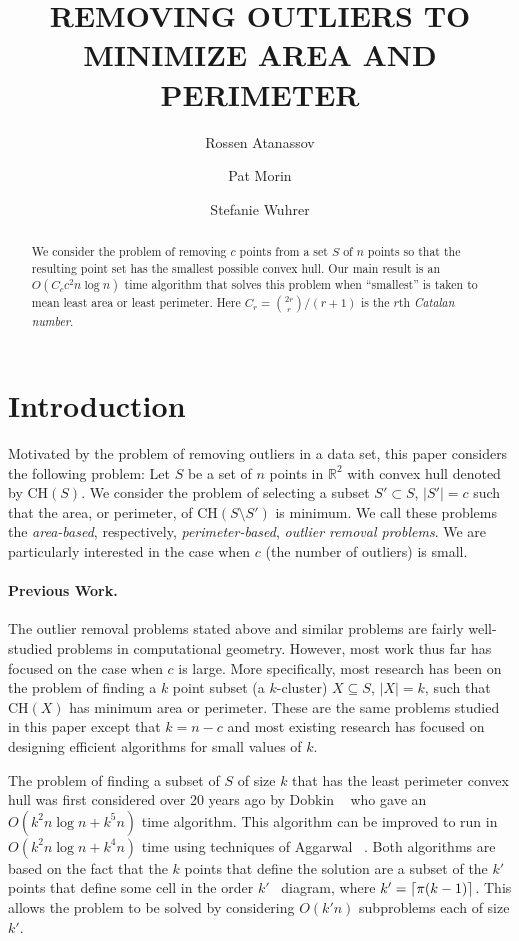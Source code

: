 \documentclass[lotsofwhite]{patmorin}
\title{\MakeUppercase{Removing Outliers to Minimize Area and Perimeter}}
\author{Rossen Atanassov \and
    Pat Morin \and
    Stefanie Wuhrer}
\date{}
\newcommand{\ch}{\mathrm{CH}}
\newcommand{\ntypes}{C_c}
\newcommand{\timepertype}{c^2 n\log n}
\newcommand{\runtime}{\ntypes \timepertype}
\begin{document}
\maketitle

\begin{abstract}
We consider the problem of removing $c$ points from a set $S$ of $n$
points so that the resulting point set has the smallest possible
convex hull.  Our main result is an $O(\runtime)$ time algorithm
that solves this problem when ``smallest'' is taken to mean least area
or least perimeter. Here $C_r = {2r\choose r}/(r+1)$ is
the $r$th \emph{Catalan number}.
\end{abstract}

\section{Introduction}

Motivated by the problem of removing outliers in a data set, this
paper considers the following problem: Let $S$ be a set of $n$ points
in $\mathbb{R}^2$ with convex hull denoted by $\ch(S)$.  We consider
the problem of selecting a subset $S'\subset S$, $|S'|=c$ such that
the area, or perimeter, of $\ch(S\setminus S')$ is minimum.  We call
these problems the \emph{area-based}, respectively,
\emph{perimeter-based}, \emph{outlier removal problems}.  We are
particularly interested in the case when $c$ (the number of outliers)
is small.

\paragraph{Previous Work.} 

The outlier removal problems stated above and similar problems are
fairly well-studied problems in computational geometry.  However, most
work thus far has focused on the case when $c$ is large. More
specifically, most research has been on the problem of finding a $k$
point subset (a $k$-cluster) $X\subseteq S$, $|X|=k$, such that
$\ch(X)$ has minimum area or perimeter. These are the same problems
studied in this paper except that $k=n-c$ and most existing research
has focused on designing efficient algorithms for small values of $k$.

The problem of finding a subset of $S$ of size $k$ that has the least
perimeter convex hull was first considered over 20 years ago by Dobkin
\etal\ \cite{ddg83} who gave an $O(k^2n\log n + k^5 n)$ time
algorithm.  This algorithm can be improved to run in $O(k^2 n\log n +
k^4 n)$ time using techniques of Aggarwal \etal\ \cite{aiks89}.  Both
algorithms are based on the fact that the $k$ points that define the
solution are a subset of the $k'$ points that define some cell in the
order $k'$ \voronoi\ diagram, where $k'=\left\lceil \pi (k-1) \right\rceil$.  This
allows the problem to be solved by considering $O(k'n)$ subproblems
each of size $k'$.
\end{document}
